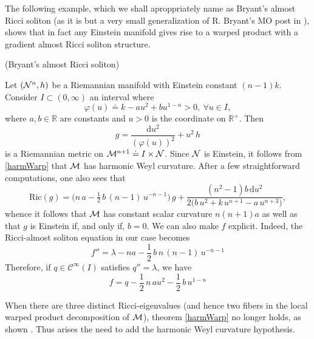   The following example, which we shall aproppriately name as Bryant's almost Ricci soliton (as it is but a very small generalization of R. Bryant's MO post in ), shows that in fact any Einstein manifold gives rise to a warped product with a gradient almost Ricci soliton structure.

   \begin{exem}(Bryant's almost Ricci soliton)\par
	\textnormal{
	Let $\left(\mathcal{N}^n, h \right)$ be a Riemannian manifold with Einstein constant $(n-1)k$. Consider $I \subset (0, \infty)$ an interval where \[ \varphi(u) \doteq k - au^2 + b u^{1-n} > 0, \ \forall u \in I, \] where $a, b \in \mathbb{R}$ are constants and $u > 0$ is the coordinate on $\mathbb{R}^{+}$. Then
	\[
	g = \frac{\mathrm{d}u^2}{(\varphi(u))^2} + u^2\,h
	\]
	is a Riemannian metric on $ \mathcal{M}^{n+1} \doteq I \times \mathcal{N}$. Since $\mathcal{N}$ is Einstein, it follows from \cref{harmWarp} that $\mathcal{M}$ has harmonic Weyl curvature. After a few straightforward computations, one also sees that
	\[
	\mathrm{Ric}(g) = \bigl(n\,a - \tfrac{1}{2}\,b\,(n-1) \, u^{-n-1}\bigr)\,g  + \frac{(n^2{-}1)b\,\mathrm{d}u^2}{2\bigl(b\,u^2+k\,u^{n+1}-a\,u^{n+3}\bigr)},
	\] whence it follows that $\mathcal{M}$ has constant scalar curvature $n(n+1)a$ as well as that $g$ is Einstein if, and only if, $b = 0$. We can also make $f$ explicit. Indeed, the Ricci-almost soliton equation in our case becomes
	\[
	f'' = \lambda - na - \frac{1}{2} \, b \, n \, (n-1) \, u^{-n-1}
	\]
	Therefore, if $q \in \mathscr{C}^{\infty}(I)$ satisfies $q'' = \lambda$, we have
	\[
	f = q - \frac{1}{2} \, n \, a u^2 - \frac{1}{2} \, b \, u^{1-n}
	\]
	}
	\end{exem}
   When there are three distinct Ricci-eigenvalues (and hence two fibers in the local warped product decomposition of $\mathcal{M}$), theorem \cref{harmWarp} no longer holds, as shown . Thus arises the need to add the harmonic Weyl curvature hypothesis. \\ 


